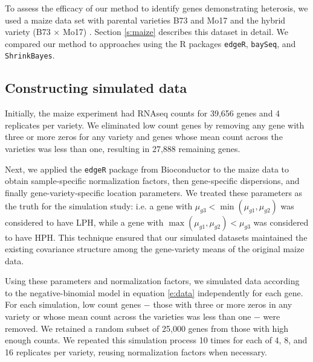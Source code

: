 \documentclass[useAMS,usenatbib,referee]{biom}
\begin{document}
% 

To assess the efficacy of our method to identify genes demonstrating heterosis, we used a maize data set with parental varieties B73 and Mo17 and the hybrid variety (B73 $\times$ Mo17) \citep{paschold2012complementation}. Section \ref{s:maize} describes this dataset in detail. We compared our method to approaches using the R packages {\tt edgeR}, {\tt baySeq}, and {\tt ShrinkBayes}.

\subsection{Constructing simulated data}
\label{s:sim_data}

Initially, the maize experiment had RNAseq counts for 39,656 genes and 4 replicates per variety. We eliminated low count genes by removing any gene with three or more zeros for any variety and genes whose mean count across the varieties was less than one, resulting in 27,888 remaining genes.

Next, we applied the {\tt edgeR} package \citep{robinson2010edgeR} from Bioconductor \citep{gentleman2004bioconductor} to the maize data to obtain sample-specific normalization factors, then gene-specific dispersions, and finally gene-variety-specific location parameters. We treated these parameters as the truth for the simulation study: i.e. a gene with $\mu_{g3} < \min(\mu_{g1}, \mu_{g2})$ was considered to have LPH, while a gene with $\max(\mu_{g1},\mu_{g2}) < \mu_{g3}$ was considered to have HPH. This technique ensured that our simulated datasets maintained the existing covariance structure among the gene-variety means of the original maize data.

Using these parameters and normalization factors, we simulated data according to the negative-binomial model in equation \eqref{e:data} independently for each gene. For each simulation, low count genes $-$ those with three or more zeros in any variety or whose mean count across the varieties was less than one $-$ were removed. We retained a random subset of 25,000 genes from those with high enough counts. We repeated this simulation process 10 times for each of 4, 8, and 16 replicates per variety, reusing normalization factors when necessary.
\end{document}
